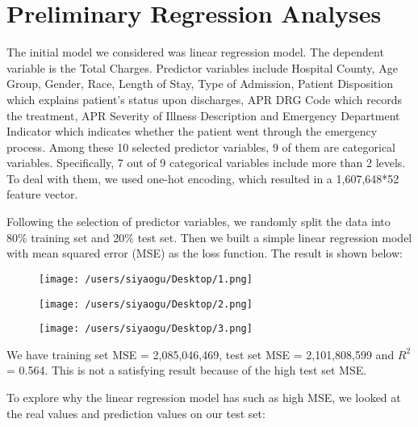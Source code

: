 \documentclass[journal, a4paper,11pt]{IEEEtran}
\begin{document}
\section{Preliminary Regression Analyses}
	The initial model we considered was linear regression model. The dependent variable is the Total Charges. Predictor variables include Hospital County, Age Group, Gender, Race, Length of Stay, Type of Admission, Patient Disposition which explains patient's status upon discharges, APR DRG Code which records the treatment, APR Severity of Illness Description and Emergency Department Indicator which indicates whether the patient went through the emergency process. Among these 10 selected predictor variables, 9 of them are categorical variables. Specifically, 7 out of 9 categorical variables include more than 2 levels. To deal with them, we used one-hot encoding, which resulted in a 1,607,648*52 feature vector. 

	Following the selection of predictor variables, we randomly split the data into 80\% training set and 20\% test set. Then we built a simple linear regression model with mean squared error (MSE) as the loss function. The result is shown below: 
	\bigbreak
	\bigbreak
	\bigbreak
	\bigbreak\bigbreak
	\bigbreak\bigbreak
	\bigbreak\bigbreak
	\bigbreak\bigbreak
	\bigbreak

\begin{figure}[!htb]
   \begin{minipage}{0.5\textwidth}
     \centering
     \texttt{[image: /users/siyaogu/Desktop/1.png]}
   \end{minipage}\hfill
   \begin {minipage}{0.5\textwidth}
     \centering
     \texttt{[image: /users/siyaogu/Desktop/2.png]}
   \end{minipage}
   \begin {minipage}{0.5\textwidth}
     \centering
     \texttt{[image: /users/siyaogu/Desktop/3.png]}
   \end{minipage}
\end{figure}

	We have training set MSE = 2,085,046,469, test set MSE = 2,101,808,599 and $R^2$ = 0.564. This is not a satisfying result because of the high test set MSE.
	
	To explore why the linear regression model has such as high MSE, we looked at the real values and prediction values on our test set:

\bigbreak
	\bigbreak\bigbreak
	\bigbreak
	\bigbreak
	\bigbreak
	\bigbreak
	
\end{document}
